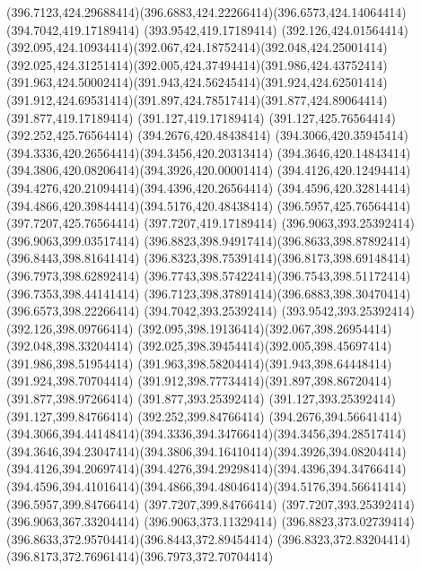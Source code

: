 {{	\curveto(396.7123,424.29688414)(396.6883,424.22266414)(396.6573,424.14064414)
	\lineto(394.7042,419.17189414)
	\lineto(393.9542,419.17189414)
	\lineto(392.126,424.01564414)
	\curveto(392.095,424.10934414)(392.067,424.18752414)(392.048,424.25001414)
	\curveto(392.025,424.31251414)(392.005,424.37494414)(391.986,424.43752414)
	\curveto(391.963,424.50002414)(391.943,424.56245414)(391.924,424.62501414)
	\curveto(391.912,424.69531414)(391.897,424.78517414)(391.877,424.89064414)
	\lineto(391.877,419.17189414)
	\lineto(391.127,419.17189414)
	\lineto(391.127,425.76564414)
	\lineto(392.252,425.76564414)
	\lineto(394.2676,420.48438414)
	\curveto(394.3066,420.35945414)(394.3336,420.26564414)(394.3456,420.20313414)
	\curveto(394.3646,420.14843414)(394.3806,420.08206414)(394.3926,420.00001414)
	\curveto(394.4126,420.12494414)(394.4276,420.21094414)(394.4396,420.26564414)
	\curveto(394.4596,420.32814414)(394.4866,420.39844414)(394.5176,420.48438414)
	\lineto(396.5957,425.76564414)
	\lineto(397.7207,425.76564414)
	\lineto(397.7207,419.17189414)
	\closepath
	\moveto(396.9063,393.25392414)
	\lineto(396.9063,399.03517414)
	\curveto(396.8823,398.94917414)(396.8633,398.87892414)(396.8443,398.81641414)
	\curveto(396.8323,398.75391414)(396.8173,398.69148414)(396.7973,398.62892414)
	\curveto(396.7743,398.57422414)(396.7543,398.51172414)(396.7353,398.44141414)
	\curveto(396.7123,398.37891414)(396.6883,398.30470414)(396.6573,398.22266414)
	\lineto(394.7042,393.25392414)
	\lineto(393.9542,393.25392414)
	\lineto(392.126,398.09766414)
	\curveto(392.095,398.19136414)(392.067,398.26954414)(392.048,398.33204414)
	\curveto(392.025,398.39454414)(392.005,398.45697414)(391.986,398.51954414)
	\curveto(391.963,398.58204414)(391.943,398.64448414)(391.924,398.70704414)
	\curveto(391.912,398.77734414)(391.897,398.86720414)(391.877,398.97266414)
	\lineto(391.877,393.25392414)
	\lineto(391.127,393.25392414)
	\lineto(391.127,399.84766414)
	\lineto(392.252,399.84766414)
	\lineto(394.2676,394.56641414)
	\curveto(394.3066,394.44148414)(394.3336,394.34766414)(394.3456,394.28517414)
	\curveto(394.3646,394.23047414)(394.3806,394.16410414)(394.3926,394.08204414)
	\curveto(394.4126,394.20697414)(394.4276,394.29298414)(394.4396,394.34766414)
	\curveto(394.4596,394.41016414)(394.4866,394.48046414)(394.5176,394.56641414)
	\lineto(396.5957,399.84766414)
	\lineto(397.7207,399.84766414)
	\lineto(397.7207,393.25392414)
	\closepath
	\moveto(396.9063,367.33204414)
	\lineto(396.9063,373.11329414)
	\curveto(396.8823,373.02739414)(396.8633,372.95704414)(396.8443,372.89454414)
	\curveto(396.8323,372.83204414)(396.8173,372.76961414)(396.7973,372.70704414)
}}
